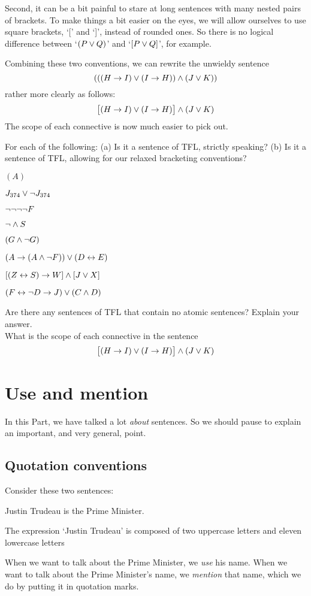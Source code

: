 Second, it can be a bit painful to stare at long sentences with many nested pairs of brackets. To make things a bit easier on the eyes, we will allow ourselves to use square brackets, `[' and `]', instead of rounded ones. So there is no logical difference between `$(P\vee Q)$' and `$[P\vee Q]$', for example. 

Combining these two conventions, we can rewrite the unwieldy sentence
$$(((H \rightarrow I) \vee (I \rightarrow H)) \wedge (J \vee K))$$
rather more clearly as follows:
$$\bigl[(H \rightarrow I) \vee (I \rightarrow H)\bigr] \wedge (J \vee K)$$
The scope of each connective is now much easier to pick out.

\practiceproblems

\solutions
\problempart
\label{pr.wiffTFL}
For each of the following: (a) Is it a sentence of TFL, strictly speaking? (b) Is it a sentence of TFL, allowing for our relaxed bracketing conventions?
\begin{earg}
\item $(A)$
\item $J_{374} \vee \neg J_{374}$
\item $\neg \neg \neg \neg F$
\item $\neg \wedge S$
\item $(G \wedge \neg G)$
\item $(A \rightarrow (A \wedge \neg F)) \vee (D \leftrightarrow E)$
\item $[(Z \leftrightarrow S) \rightarrow W] \wedge [J \vee X]$
\item $(F \leftrightarrow \neg D \rightarrow J) \vee (C \wedge D)$
\end{earg}

\problempart
Are there any sentences of TFL that contain no atomic sentences? Explain your answer.\\

\problempart
What is the scope of each connective in the sentence
$$\bigl[(H \rightarrow I) \vee (I \rightarrow H)\bigr] \wedge (J \vee K)$$


\chapter{Use and mention}\label{s:UseMention}
In this Part, we have talked a lot \emph{about} sentences. So we should pause to explain an important, and very general, point.

\section{Quotation conventions}
Consider these two sentences:
	\begin{ebullet}
		\item Justin Trudeau is the Prime Minister.
		\item The expression `Justin Trudeau' is composed of two uppercase letters and eleven lowercase letters
	\end{ebullet}
When we want to talk about the Prime Minister, we \emph{use} his name. When we want to talk about the Prime Minister's name, we \emph{mention} that name, which we do by putting it in quotation marks.

